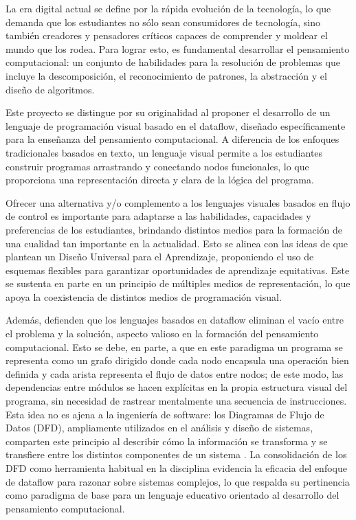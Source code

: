 
La era digital actual se define por la rápida evolución de la tecnología, lo que demanda que los estudiantes no sólo sean consumidores de tecnología, sino también creadores y pensadores críticos capaces de comprender y moldear el mundo que los rodea. Para lograr esto, es fundamental desarrollar el pensamiento computacional: un conjunto de habilidades para la resolución de problemas que incluye la descomposición, el reconocimiento de patrones, la abstracción y el diseño de algoritmos.

Este proyecto se distingue por su originalidad al proponer el desarrollo de un lenguaje de programación visual basado en el dataflow, diseñado específicamente para la enseñanza del pensamiento computacional. A diferencia de los enfoques tradicionales basados en texto, un lenguaje visual permite a los estudiantes construir programas arrastrando y conectando nodos funcionales, lo que proporciona una representación directa y clara de la lógica del programa.

Ofrecer una alternativa y/o complemento a los lenguajes visuales basados en flujo de control es importante para adaptarse a las habilidades, capacidades y preferencias de los estudiantes, brindando distintos medios para la formación de una cualidad tan importante en la actualidad. Esto se alinea con las ideas de  que plantean un Diseño Universal para el Aprendizaje, proponiendo el uso de esquemas flexibles para garantizar oportunidades de aprendizaje equitativas. Este se sustenta en parte en un principio de múltiples medios de representación, lo que apoya la coexistencia de distintos medios de programación visual.

Además,  defienden que los lenguajes basados en dataflow eliminan el vacío entre el problema y la solución, aspecto valioso en la formación del pensamiento computacional. Esto se debe, en parte, a que en este paradigma un programa se representa como un grafo dirigido donde cada nodo encapsula una operación bien definida y cada arista representa el flujo de datos entre nodos; de este modo, las dependencias entre módulos se hacen explícitas en la propia estructura visual del programa, sin necesidad de rastrear mentalmente una secuencia de instrucciones. Esta idea no es ajena a la ingeniería de software: los Diagramas de Flujo de Datos (DFD), ampliamente utilizados en el análisis y diseño de sistemas, comparten este principio al describir cómo la información se transforma y se transfiere entre los distintos componentes de un sistema \cite[p.~59]{pressman2010}. La consolidación de los DFD como herramienta habitual en la disciplina evidencia la eficacia del enfoque de dataflow para razonar sobre sistemas complejos, lo que respalda su pertinencia como paradigma de base para un lenguaje educativo orientado al desarrollo del pensamiento computacional.

